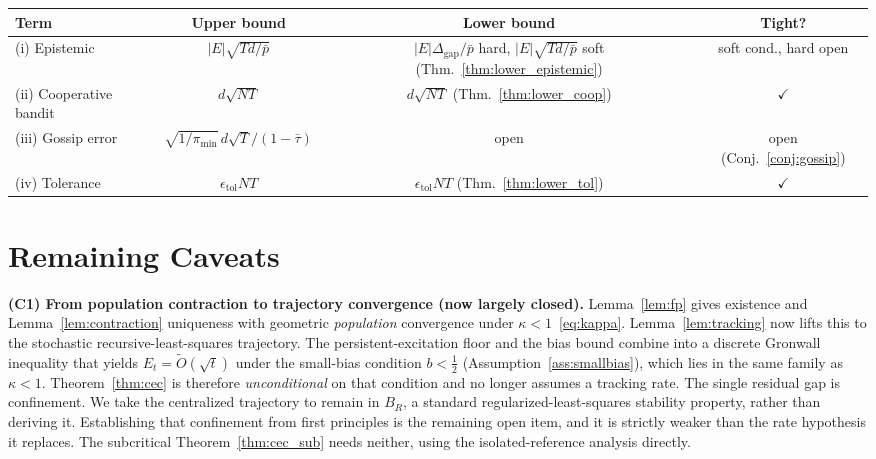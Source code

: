 \documentclass[11pt]{article}
\begin{document}
\begin{center}
\begin{tabular}{lccc}
\hline
Term & Upper bound & Lower bound & Tight?\\
\hline
(i) Epistemic & $|E|\sqrt{Td/\bar{p}}$ &
$|E|\Delta_{\mathrm{gap}}/\bar p$ hard, $|E|\sqrt{Td/\bar{p}}$ soft (Thm.~\ref{thm:lower_epistemic}) &
soft cond., hard open\\
(ii) Cooperative bandit & $d\sqrt{NT}$ &
$d\sqrt{NT}$ (Thm.~\ref{thm:lower_coop}) & $\checkmark$\\
(iii) Gossip error & $\sqrt{1/\pi_{\min}}\,d\sqrt T/(1-\bar\tau)$ & open &
open (Conj.~\ref{conj:gossip})\\
(iv) Tolerance & $\epsilon_{\mathrm{tol}}NT$ &
$\epsilon_{\mathrm{tol}}NT$ (Thm.~\ref{thm:lower_tol}) & $\checkmark$\\
\hline
\end{tabular}
\end{center}

\section{Remaining Caveats}\label{sec:caveats}

\textbf{(C1) From population contraction to trajectory convergence
(now largely closed).}
Lemma~\ref{lem:fp} gives existence and Lemma~\ref{lem:contraction}
uniqueness with geometric \emph{population} convergence under
$\kappa<1$~\eqref{eq:kappa}.  Lemma~\ref{lem:tracking} now lifts this to
the stochastic recursive-least-squares trajectory. The
persistent-excitation floor and the bias bound combine into a discrete
Gronwall inequality that yields $E_t=\widetilde O(\sqrt t)$ under the
small-bias condition $b<\tfrac12$ (Assumption~\ref{ass:smallbias}),
which lies in the same family as $\kappa<1$.  Theorem~\ref{thm:cec} is
therefore \emph{unconditional} on that condition and no longer assumes a
tracking rate.  The single residual gap is confinement. We take the
centralized trajectory to remain in $B_R$, a standard
regularized-least-squares stability property, rather than deriving it.
Establishing that confinement from first principles is the remaining
open item, and it is strictly weaker than the rate hypothesis it
replaces.  The subcritical Theorem~\ref{thm:cec_sub} needs neither,
using the isolated-reference analysis directly.
\end{document}
